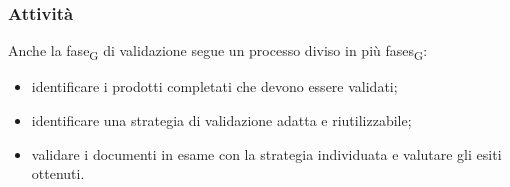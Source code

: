     \subsubsection{Attività}
    Anche la \gls{fase}\textsubscript{G} di validazione segue un processo diviso in più \glspl{fase}\textsubscript{G}:
    \begin{itemize}
    	\item identificare i prodotti completati che devono essere validati;
    	\item identificare una strategia di validazione adatta e riutilizzabile;
    	\item validare i documenti in esame con la strategia individuata e valutare gli esiti ottenuti.
    \end{itemize}
    


